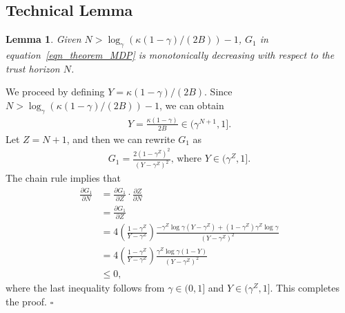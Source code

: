 \documentclass[10pt]{article}
\def\eqref#1{equation~\ref{#1}}
\newtheorem{lemma}{Lemma}
\newenvironment{myproof}{{\noindent\it Proof. }}{\hfill $\square$ \par}
\begin{document}
\subsection{Technical Lemma}
\label{appendix_tech_lemma}
\begin{lemma}\label{lemma_mono_decrease}
    Given $N > \log_\gamma \left( \kappa (1-\gamma)/(2B) \right)-1$, $G_1$ in \eqref{eqn_theorem_MDP} is monotonically decreasing with respect to the trust horizon $N$.
\end{lemma}
\begin{myproof}
    We proceed by defining $Y = \kappa (1-\gamma)/(2B)$.
    Since $N > \log_\gamma \left( \kappa (1-\gamma)/(2B) \right)-1$, we can obtain
    \begin{align}
        Y = \frac{\kappa \left( 1-\gamma \right)}{2B} \in (\gamma^{N+1}, 1].
    \end{align}
    Let $Z = N+1$, and then we can rewrite $G_1$ as
    \begin{align}
        G_1 = \frac{ 2 \left( 1-\gamma^{Z}\right)^2}{ \left(Y - \gamma^{Z}\right)^2}, \, \text{where} \,\, Y \in (\gamma^{Z}, 1].
    \end{align}
    The chain rule implies that
    \begin{align}
        \frac{\partial G_1}{\partial N} &= \frac{\partial G_1}{\partial Z} \cdot \frac{\partial Z}{\partial N} \\
        &=\frac{\partial G_1}{\partial Z} \\
        &=4 \left( \frac{1-\gamma^{Z}}{Y - \gamma^{Z}} \right) \frac{-\gamma^{Z} \log \gamma (Y - \gamma^{Z}) + (1-\gamma^{Z}) \gamma^{Z} \log \gamma }{(Y - \gamma^{Z})^2} \\
        &=4 \left( \frac{1-\gamma^{Z}}{Y - \gamma^{Z}} \right) \frac{\gamma^{Z} \log \gamma (1-Y)}{(Y - \gamma^{Z})^2} \\
        &\leq 0,
    \end{align}
    where the last inequality follows from $\gamma \in (0, 1]$ and $Y \in (\gamma^{Z}, 1]$.
    This completes the proof.
\end{myproof}
\end{document}
